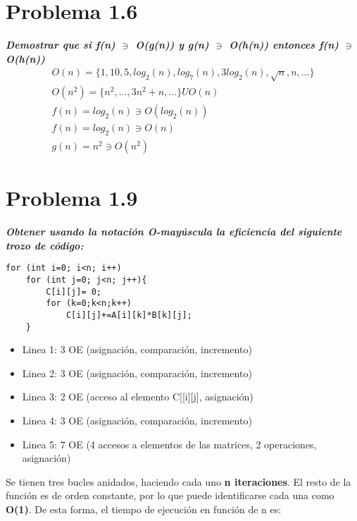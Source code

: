 \section{Problema 1.6}
\textbf{\textit{Demostrar que si f(n) $ \ni $ O(g(n)) y g(n) $ \ni $ O(h(n)) entonces f(n) $ \ni $ O(h(n))}}
\begin{gather*}
	O(n) = \{1, 10, 5, log_{2}(n), log_{7}(n),3 log_{2}(n), \sqrt{n}, n, ...\}\\	
	O(n^2) = \{n^2,..., 3n^2+n,...\} U O(n) \\
	f(n) = log_{2}(n) \ni O(log_{2}(n))\\
	f(n) = log_{2}(n) \ni O(n)\\
	g(n) = n^2 \ni O(n^2)
\end{gather*}


\section{Problema 1.9}
\textbf{\textit{Obtener usando la notación O-mayúscula la eficiencia del siguiente trozo de código:}}
\begin {lstlisting}						
for (int i=0; i<n; i++)						
	for (int j=0; j<n; j++){
		C[i][j]= 0;
		for (k=0;k<n;k++)
			C[i][j]+=A[i][k]*B[k][j];
	}
\end{lstlisting}

\begin{itemize}
\item Linea 1: 3 OE (asignación, comparación, incremento) 
\item Linea 2: 3 OE (asignación, comparación, incremento)
\item Linea 3: 2 OE (acceso al elemento C[[i][j], asignación)
\item Linea 4: 3 OE (asignación, comparación, incremento)
\item Linea 5: 7 OE (4 accesos a elementos de las matrices, 2 operaciones, asignación)
\end{itemize}
Se tienen tres bucles anidados, haciendo cada uno \textbf{n iteraciones}. El resto de la función es de orden constante, por lo que puede identificarse cada una como \textbf{O(1)}. De esta forma, el tiempo de ejecución en función de n es:

